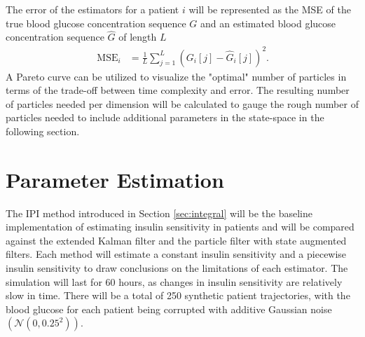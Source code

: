 \documentclass[nomenclature, english, bibtex]{kththesis}
\begin{document}
The error of the estimators for a patient $i$ will be represented as the \gls{MSE} of the true blood glucose concentration sequence $G$ and an estimated blood glucose concentration sequence $\hat{G}$ of length $L$\begin{align}
\,\text{MSE}_i &= \frac{1}{L} \sum_{j=1}^{L} \left(G_i[j] - \hat{G}_i[j]\right)^2.
\end{align}
A Pareto curve can be utilized to visualize the "optimal" number of particles in terms of the trade-off between time complexity and error. The resulting number of particles needed per dimension will be calculated to gauge the rough number of particles needed to include additional parameters in the state-space in the following section. 

\section{Parameter Estimation}

The \gls{IPI} method introduced in Section \ref{sec:integral} will be the baseline implementation of estimating insulin sensitivity in patients and will be compared against the extended Kalman filter and the particle filter with state augmented filters. Each method will estimate a constant insulin sensitivity and a piecewise insulin sensitivity to draw conclusions on the limitations of each estimator. The simulation will last for 60 hours, as changes in insulin sensitivity are relatively slow in time. There will be a total of 250 synthetic patient trajectories, with the blood glucose for each patient being corrupted with additive Gaussian noise $\left(\mathcal{N}(0, 0.25^2)\right)$.

\end{document}
